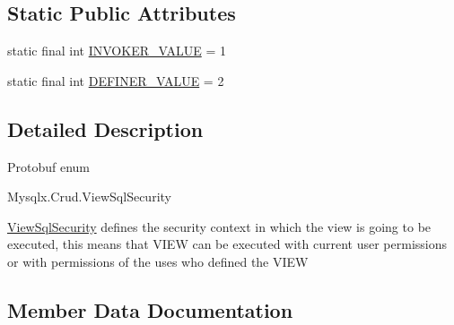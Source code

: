 \subsection*{Static Public Attributes}
\begin{DoxyCompactItemize}
\item 
static final int \mbox{\hyperlink{enumcom_1_1mysql_1_1cj_1_1x_1_1protobuf_1_1_mysqlx_crud_1_1_view_sql_security_ad7ec3c31af486f6a2afd25489e56a120}{I\+N\+V\+O\+K\+E\+R\+\_\+\+V\+A\+L\+UE}} = 1
\item 
static final int \mbox{\hyperlink{enumcom_1_1mysql_1_1cj_1_1x_1_1protobuf_1_1_mysqlx_crud_1_1_view_sql_security_a7133a5cc79c403d9870dd1d739f3f89d}{D\+E\+F\+I\+N\+E\+R\+\_\+\+V\+A\+L\+UE}} = 2
\end{DoxyCompactItemize}


\subsection{Detailed Description}
Protobuf enum
\begin{DoxyCode}
Mysqlx.Crud.ViewSqlSecurity 
\end{DoxyCode}



\begin{DoxyPre}
\mbox{\hyperlink{enumcom_1_1mysql_1_1cj_1_1x_1_1protobuf_1_1_mysqlx_crud_1_1_view_sql_security}{ViewSqlSecurity}} defines the security context in which the view is going to be
executed, this means that VIEW can be executed with current user permissions or
with permissions of the uses who defined the VIEW
\end{DoxyPre}
 

\subsection{Member Data Documentation}
\mbox{\label{enumcom_1_1mysql_1_1cj_1_1x_1_1protobuf_1_1_mysqlx_crud_1_1_view_sql_security_aec1137dbb0a2be64956f2b0552a9686e}} 
